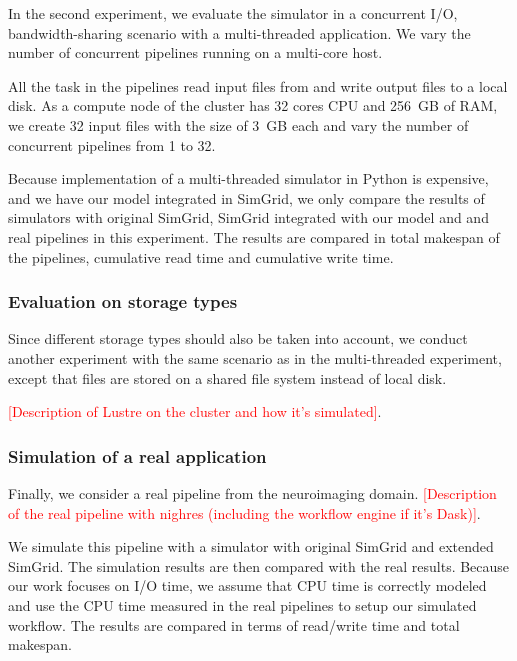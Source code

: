 \documentclass[conference]{IEEEtran}
\begin{document}
			In the second experiment, we evaluate the simulator in a concurrent I/O, 
			bandwidth-sharing scenario with a multi-threaded application. 			
			We vary the number of concurrent pipelines running on a multi-core host.  
			
			All the task in the pipelines read input files from and write output files 
			to a local disk. 
			As a compute node of the cluster has 32 cores CPU and 256~GB of RAM,  
			we create 32 input files with the size of 3~GB each and vary the number of 
			concurrent pipelines from 1 to 32. 
			
			Because implementation of a multi-threaded simulator  in Python is 
			expensive, and we have our model integrated in SimGrid, 
			we only compare the results of simulators with original SimGrid, 
			SimGrid integrated with our model and and real pipelines in this 
			experiment. The results are compared in total makespan of the pipelines, 
			cumulative read time and cumulative write time.
			
			\subsubsection{Evaluation on storage types}
			
		    Since different storage types should also be taken into account, 
		    we conduct another experiment with the same scenario as 
		    in the multi-threaded experiment, except that files are stored on a 
		    shared file system instead of local disk. 
		    
		    \textcolor{red}{[Description of Lustre on the cluster and how it's 
		    simulated]}. 
		    
		    \subsubsection{Simulation of a real application}

		    Finally, we consider a real pipeline from the neuroimaging domain. 			
			\textcolor{red}{[Description of the real pipeline with nighres 
			(including the workflow engine if it's Dask)]}.  			
			
			We simulate this pipeline with a simulator with original SimGrid and 
			extended SimGrid. 
			The simulation results are then compared with the real results. 
			Because our work focuses on I/O time, we assume that CPU time is 
			correctly modeled and use the CPU time measured in the real pipelines 
			to setup our simulated workflow. The results are compared in terms of 
			read/write time and total makespan.
\end{document}
